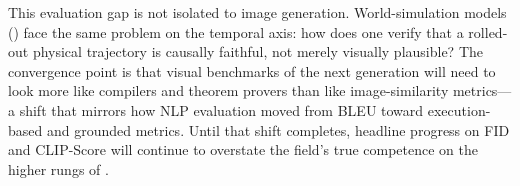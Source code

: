 This evaluation gap is not isolated to image generation. World-simulation models () face the same problem on the temporal axis: how does one verify that a rolled-out physical trajectory is causally faithful, not merely visually plausible? The convergence point is that visual benchmarks of the next generation will need to look more like compilers and theorem provers than like image-similarity metrics---a shift that mirrors how NLP evaluation moved from BLEU toward execution-based and grounded metrics. Until that shift completes, headline progress on FID and CLIP-Score will continue to overstate the field's true competence on the higher rungs of .
